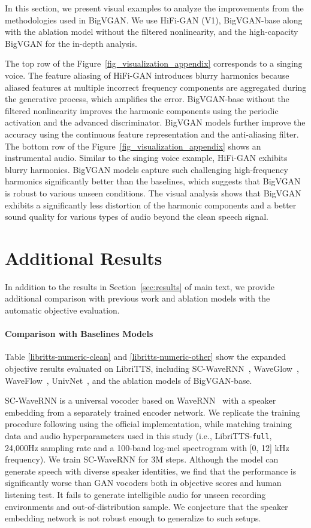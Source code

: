\documentclass{article} \usepackage{iclr2023_conference,times}
\theoremstyle{plain}
\theoremstyle{definition}
\theoremstyle{remark}
\begin{document}
In this section, we present visual examples to analyze the improvements from the methodologies used in BigVGAN. We use HiFi-GAN (V1), BigVGAN-base along with the ablation model without the filtered nonlinearity, and the high-capacity BigVGAN for the in-depth analysis.

The top row of the Figure~\ref{fig_visualization_appendix} corresponds to a singing voice. The feature aliasing of HiFi-GAN introduces blurry harmonics because aliased features at multiple incorrect frequency components are aggregated during the generative process, which amplifies the error. BigVGAN-base without the filtered nonlinearity improves the harmonic components using the periodic activation and the advanced discriminator. BigVGAN models further improve the accuracy using the continuous feature representation and the anti-aliasing filter. The bottom row of the Figure~\ref{fig_visualization_appendix} shows an instrumental audio. Similar to the singing voice example, HiFi-GAN exhibits blurry harmonics. BigVGAN models capture such challenging high-frequency harmonics significantly better than the baselines, which suggests that BigVGAN is robust to various unseen conditions. The visual analysis shows that BigVGAN exhibits a significantly less distortion of the harmonic components and a better sound quality for various types of audio beyond the clean speech signal.


\section{Additional Results}
\label{appendix:more-ablations-ljspeech-vctk}
In addition to the results in Section~\ref{sec:results} of main text, we provide additional comparison with previous work and ablation models  with the automatic objective evaluation.
\paragraph{Comparison with Baselines Models}
Table \ref{libritts-numeric-clean} and \ref{libritts-numeric-other} show the expanded objective results evaluated on LibriTTS, including SC-WaveRNN~\citep{paul2020speaker}, WaveGlow~\citep{prenger2019waveglow}, WaveFlow~\citep{ping2019waveflow}, UnivNet~\citep{jang2021univnet}, and the ablation models of BigVGAN-base.

SC-WaveRNN \citep{paul2020speaker} is a universal vocoder based on WaveRNN~\citep{kalchbrenner2018efficient} with a speaker embedding from a separately trained encoder network. We replicate the training procedure following \citep{paul2020speaker} using the official implementation, while matching training data and audio hyperparameters used in this study (i.e., LibriTTS-\texttt{full}, 24,000Hz sampling rate and a 100-band log-mel spectrogram with [0, 12] kHz frequency). We train SC-WaveRNN for 3M steps.
Although the model can generate speech with diverse speaker identities, we find that the performance is significantly worse than GAN vocoders both in objective scores and human listening test. It fails to generate intelligible audio for unseen recording environments and out-of-distribution sample. We conjecture that the speaker embedding network is not robust enough to generalize to such setups.
\end{document}
